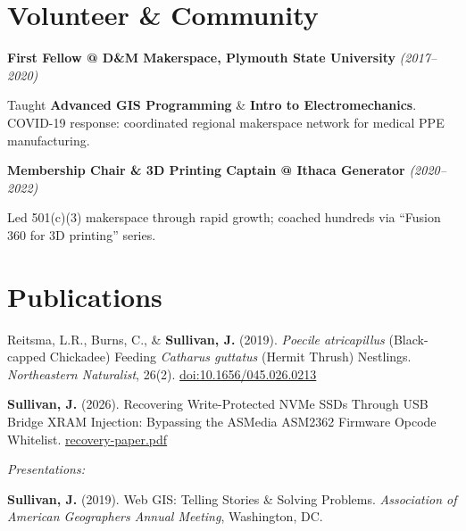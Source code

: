 \documentclass[10pt,letterpaper]{article}
\newcommand{\role}[2]{%
    \noindent\textbf{\color{secondary}#1} \hfill \textit{\color{muted}(#2)}\par\vspace{0.3em}
}
\newcommand{\cvlink}[2]{\href{#1}{\color{linkcolor}#2}}
\begin{document}
\section{Volunteer \& Community}
\label{sec:volunteer}

\role{First Fellow @ D\&M Makerspace, Plymouth State University}{2017--2020}

Taught \textbf{Advanced GIS Programming} \& \textbf{Intro to Electromechanics}. COVID-19 response: coordinated regional makerspace network for medical PPE manufacturing.

\vspace{0.3em}

\role{Membership Chair \& 3D Printing Captain @ Ithaca Generator}{2020--2022}

Led 501(c)(3) makerspace through rapid growth; coached hundreds via ``Fusion 360 for 3D printing'' series.

\section{Publications}
\label{sec:publications}

Reitsma, L.R., Burns, C., \& \textbf{Sullivan, J.} (2019). \textit{Poecile atricapillus} (Black-capped Chickadee) Feeding \textit{Catharus guttatus} (Hermit Thrush) Nestlings. \textit{Northeastern Naturalist}, 26(2). \cvlink{https://doi.org/10.1656/045.026.0213}{doi:10.1656/045.026.0213}

\vspace{0.3em}

\textbf{Sullivan, J.} (2026). Recovering Write-Protected NVMe SSDs Through USB Bridge XRAM Injection: Bypassing the ASMedia ASM2362 Firmware Opcode Whitelist. \cvlink{https://transscendsurvival.org/papers/recovery-paper.pdf}{recovery-paper.pdf}

\vspace{0.4em}
\noindent\textit{\color{muted}Presentations:}

\vspace{0.2em}
\textbf{Sullivan, J.} (2019). Web GIS: Telling Stories \& Solving Problems. \textit{Association of American Geographers Annual Meeting}, Washington, DC.


\vspace{0.4em}

\begin{center}
\end{center}
\end{document}

